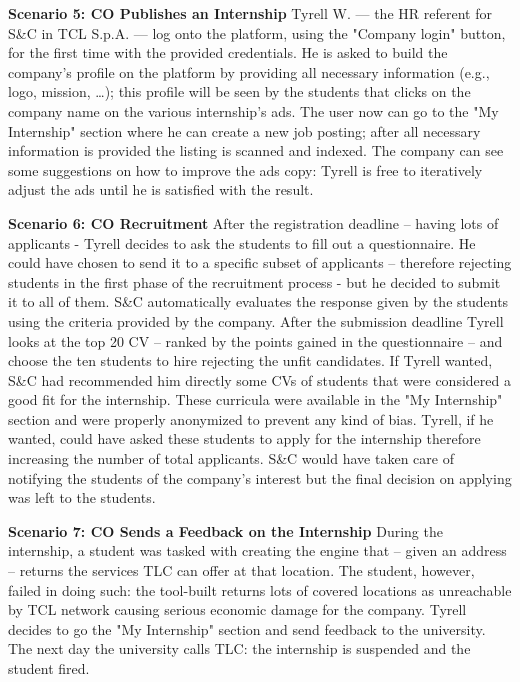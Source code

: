 \par{\textbf{Scenario 5: CO Publishes an Internship}} Tyrell W. — the HR referent for S\&C in TCL S.p.A. — log onto the
platform, using the "Company login" button, for the first time with the provided credentials. He is asked to build the
company’s profile on the platform by providing all necessary information (e.g., logo, mission, …); this profile will be
seen by the students that clicks on the company name on the various internship’s ads. The user now can go to the
"My Internship" section where he can create a new job posting; after all necessary information is provided the listing
is scanned and indexed. The company can see some suggestions on how to improve the ads copy: Tyrell is free to
iteratively adjust the ads until he is satisfied with the result.

\par{\textbf{Scenario 6: CO Recruitment}} After the registration deadline – having lots of applicants - Tyrell decides
to ask the students to fill out a questionnaire. He could have chosen to send it to a specific subset of applicants
– therefore rejecting students in the first phase of the recruitment process - but he decided to submit it to all of
them. S\&C automatically evaluates the response given by the students using the criteria provided by the company. After
the submission deadline Tyrell looks at the top 20 CV – ranked by the points gained in the questionnaire – and choose
the ten students to hire rejecting the unfit candidates. If Tyrell wanted, S\&C had recommended him directly some CVs
of students that were considered a good fit for the internship. These curricula were available in the "My Internship"
section and were properly anonymized to prevent any kind of bias. Tyrell, if he wanted, could have asked these students
to apply for the internship therefore increasing the number of total applicants. S\&C would have taken care of
notifying the students of the company's interest but the final decision on applying was left to the students.

\par{\textbf{Scenario 7: CO Sends a Feedback on the Internship}} During the internship, a student was tasked with
creating the engine that – given an address – returns the services TLC can offer at that location. The student,
however, failed in doing such: the tool-built returns lots of covered locations as unreachable by TCL network causing
serious economic damage for the company. Tyrell decides to go the "My Internship" section and send feedback to the
university. The next day the university calls TLC: the internship is suspended and the student fired.

